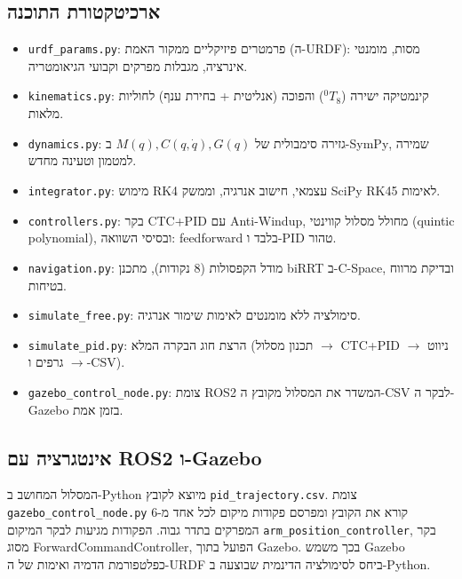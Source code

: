 \documentclass[11pt,a4paper]{article}
\begin{document}
\subsection{ארכיטקטורת התוכנה}
\begin{itemize}
    \item \texttt{\textenglish{urdf\_params.py}}: פרמטרים פיזיקליים ממקור האמת (ה-\textenglish{URDF}): מסות, מומנטי אינרציה, מגבלות מפרקים וקבועי הגיאומטריה.
    \item \texttt{\textenglish{kinematics.py}}: קינמטיקה ישירה ($^0T_8$) והפוכה (אנליטית + בחירת ענף) לחוליות מלאות.
    \item \texttt{\textenglish{dynamics.py}}: גזירה סימבולית של $M(q),C(q,\dot q),G(q)$ ב-\textenglish{SymPy}, שמירה למטמון וטעינה מחדש.
    \item \texttt{\textenglish{integrator.py}}: מימוש \textenglish{RK4} עצמאי, חישוב אנרגיה, וממשק \textenglish{SciPy RK45} לאימות.
    \item \texttt{\textenglish{controllers.py}}: בקר \textenglish{CTC+PID} עם \textenglish{Anti-Windup}, מחולל מסלול קווינטי (\textenglish{quintic polynomial}), ובסיסי השוואה: \textenglish{feedforward} בלבד ו-\textenglish{PID} טהור.
    \item \texttt{\textenglish{navigation.py}}: מודל הקפסולות (8 נקודות), מתכנן \textenglish{biRRT} ב-\textenglish{C-Space}, ובדיקת מרווח בטיחות.
    \item \texttt{\textenglish{simulate\_free.py}}: סימולציה ללא מומנטים לאימות שימור אנרגיה.
    \item \texttt{\textenglish{simulate\_pid.py}}: הרצת חוג הבקרה המלא (תכנון מסלול $\to$ \textenglish{CTC+PID} $\to$ ניווט $\to$ גרפים ו-\textenglish{CSV}).
    \item \texttt{\textenglish{gazebo\_control\_node.py}}: צומת \textenglish{ROS2} המשדר את המסלול מקובץ ה-\textenglish{CSV} לבקר ה-\textenglish{Gazebo} בזמן אמת.
\end{itemize}

\subsection{אינטגרציה עם \textenglish{ROS2} ו-\textenglish{Gazebo}}
{\sloppy המסלול המחושב ב-\textenglish{Python} מיוצא לקובץ \texttt{pid\_trajectory.csv}.
צומת \texttt{gazebo\_control\_node.py} קורא את הקובץ ומפרסם פקודות מיקום לכל אחד מ-6 המפרקים בתדר גבוה. הפקודות מגיעות לבקר המיקום \texttt{arm\_position\_controller}, בקר מסוג \textenglish{ForwardCommandController}, הפועל בתוך \textenglish{Gazebo}.
בכך משמש \textenglish{Gazebo} כפלטפורמת הדמיה ואימות של ה-\textenglish{URDF} ביחס לסימולציה הדינמית שבוצעה ב-\textenglish{Python}.\par}
\end{document}
